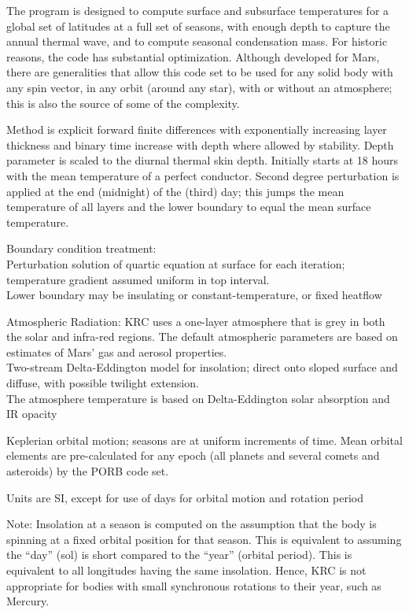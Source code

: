 \documentclass{article}
\newcommand{\qi}{\\ \hspace*{2.em}}      %
\begin{document}
The program is designed to compute surface and subsurface temperatures for a
global set of latitudes at a full set of seasons, with enough depth to capture
the annual thermal wave, and to compute seasonal condensation mass. For historic
reasons, the code has substantial optimization. Although developed for Mars,
there are generalities that allow this code set to be used for any solid body
with any spin vector, in any orbit (around any star), with or without an
atmosphere; this is also the source of some of the complexity.
 
Method is explicit forward finite differences with exponentially increasing
layer thickness and binary time increase with depth where allowed by stability.
Depth parameter is scaled to the diurnal thermal skin depth.  Initially starts
at 18 hours with the mean temperature of a perfect conductor.  Second degree
perturbation is applied at the end (midnight) of the (third) day; this jumps the
mean temperature of all layers and the lower boundary to equal the mean surface
temperature.

Boundary condition treatment:
\qi  Perturbation solution of quartic equation at surface for each iteration;
    temperature gradient assumed uniform in top interval.
\qi  Lower boundary may be insulating or constant-temperature, or fixed heatflow

Atmospheric Radiation: KRC uses a one-layer atmosphere that is grey in both the
solar and infra-red regions. The default atmospheric
parameters are based on estimates of Mars' gas and aerosol properties.
\qi  Two-stream Delta-Eddington model for insolation; direct onto sloped surface 
and diffuse, with possible twilight extension.
\\ The atmosphere temperature is based on Delta-Eddington solar absorption and IR opacity

Keplerian orbital motion; seasons are at uniform increments of time. Mean 
orbital elements are pre-calculated for any epoch (all planets and several
comets and asteroids) by the PORB code set.

Units are SI, except for use of days for orbital motion and rotation period 

Note: Insolation at a season is computed on the assumption that the body is
spinning at a fixed orbital position for that season. This is equivalent to
assuming the ``day'' (sol) is short compared to the ``year'' (orbital
period). This is equivalent to all longitudes having the same insolation. Hence,
KRC is not appropriate for bodies with small synchronous rotations to their
year, such as Mercury.
\end{document}
